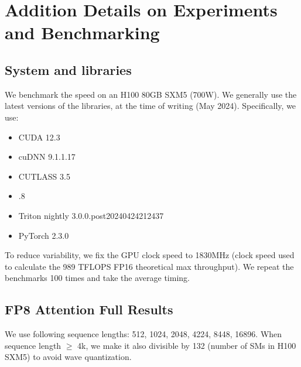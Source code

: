 \section{Addition Details on Experiments and Benchmarking}

\subsection{System and libraries}
\label{sec:system}

We benchmark the speed on an H100 80GB SXM5 (700W).
We generally use the latest versions of the libraries, at the time of writing
(May 2024).
Specifically, we use:
\begin{itemize}
\item CUDA 12.3
\item cuDNN 9.1.1.17
\item CUTLASS 3.5
\item {}.8
\item Triton nightly 3.0.0.post20240424212437
\item PyTorch 2.3.0
\end{itemize}

To reduce variability, we fix the GPU clock speed to 1830MHz (clock speed used
to calculate the 989 TFLOPS FP16 theoretical max throughput).
We repeat the benchmarks 100 times and take the average timing.






\subsection{FP8 Attention Full Results}
\label{sec:benchmark_attn_fp8_full}

We use following sequence lengths: 512, 1024, 2048, 4224, 8448, 16896.
When sequence length $\geq$ 4k, we make it also divisible by 132 (number of SMs in H100 SXM5) to avoid wave quantization.

